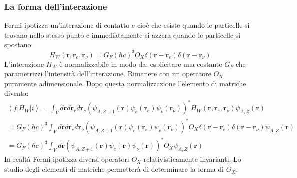 \subsubsection{La forma dell'interazione}
Fermi ipotizza un'interazione di contatto e cioè che esiste quando le particelle si trovano nello stesso punto e immediatamente si azzera quando le particelle si spostano:
\begin{equation*}
    H_W(\mathbf{r},\mathbf{r}_e,\mathbf{r}_\nu)=G_F(\hbar c)^3O_X\delta(\mathbf{r}-\mathbf{r}_e)\delta(\mathbf{r}-\mathbf{r}_\nu)
\end{equation*}
L'interazione $H_W$ è normalizzabile in modo da: esplicitare una costante $G_F$ che parametrizzi l'intensità dell'interazione. Rimanere con un operatore $O_X$ puramente adimensionale. Dopo questa normalizzazione l'elemento di matriche diventa:
\begin{align*}
    \left\langle f\left|H_W\right| i\right\rangle=\int_V d \mathbf{r} d \mathbf{r}_e d \mathbf{r}_\nu\left(\psi_{A, Z+1}(\mathbf{r}) \psi_e\left(\mathbf{r}_e\right) \psi_\nu\left(\mathbf{r}_\nu\right)\right)^* H_W\left(\mathbf{r}, \mathbf{r}_e, \mathbf{r}_\nu\right) \psi_{A, Z}(\mathbf{r}) \\ =G_F(\hbar c)^3 \int_V d \mathbf{r} d \mathbf{r}_e d \mathbf{r}_\nu\left(\psi_{A, Z+1}(\mathbf{r}) \psi_e\left(\mathbf{r}_e\right) \psi_v\left(\mathbf{r}_\nu\right)\right)^* O_X \delta\left(\mathbf{r}-\mathbf{r}_e\right) \delta\left(\mathbf{r}-\mathbf{r}_\nu\right) \psi_{A, Z}(\mathbf{r}) \\ =G_F(\hbar c)^3 \int_V d \mathbf{r}\left(\psi_{A, Z+1}(\mathbf{r}) \psi_e(\mathbf{r}) \psi_\nu(\mathbf{r})\right)^* O_X \psi_{A, Z}(\mathbf{r})
\end{align*}
In realtà Fermi ipotizza diversi operatori $O_X$ relativisticamente invarianti. Lo studio degli elementi di matriche permetterà di determinare la forma di $O_X$.
